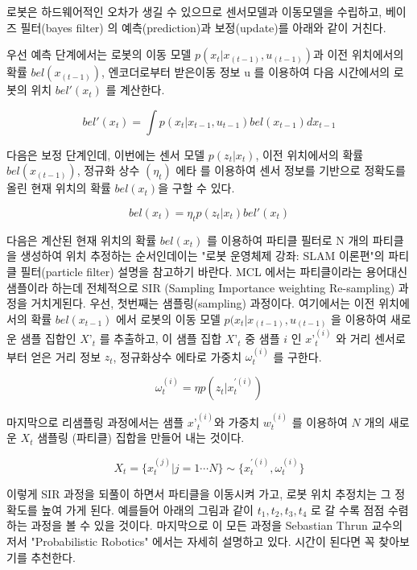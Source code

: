 로봇은 하드웨어적인 오차가 생길 수 있으므로 센서모델과 이동모델을 수립하고, 베이즈 필터(bayes filter) 의  예측(prediction)과 보정(update)를 아래와 같이 거친다. 

우선 예측 단계에서는 로봇의 이동 모델 $p( x_t | x_{(t-1)}, u_{(t-1)} )$과 이전 위치에서의 확률 $bel(x_{(t-1)})$, 엔코더로부터 받은이동 정보 u 를 이용하여 다음 시간에서의 로봇의 위치 $bel'(x_t)$ 를 계산한다.

\begin{equation}
  bel'(x_t) = \int p(x_t | x_{t-1},u_{t-1})bel(x_{t-1})dx_{t-1}
\end{equation}

다음은 보정 단계인데, 이번에는 센서 모델 $p( z_t | x_t )$, 이전 위치에서의 확률 $bel(x_{(t-1)})$, 정규화 상수 $(\eta_t)$ 에타 를 이용하여 센서 정보를 기반으로 정확도를 올린 현재 위치의 확률  $bel(x_t)$을 구할 수 있다.

\begin{equation}
  bel(x_t) = \eta_t p(z_t|x_t)bel'(x_t)
\end{equation}

다음은 계산된 현재 위치의 확률 $bel(x_t)$ 를 이용하여 파티클 필터로 N 개의 파티클을 생성하여 위치 추정하는 순서인데이는 "로봇 운영체제 강좌: SLAM 이론편"의 파티클 필터(particle filter) 설명을 참고하기 바란다. MCL 에서는 파티클이라는 용어대신 샘플이라 하는데 전체적으로 SIR (Sampling Importance weighting Re-sampling) 과정을 거치게된다. 우선, 첫번째는 샘플링(sampling) 과정이다. 여기에서는 이전 위치에서의 확률 $bel(x_{t-1})$ 에서 로봇의 이동 모델 $p( x_t | x_{(t-1)}, u_{(t-1)}$ 을 이용하여 새로운 샘플 집합인 ${X’}_t$  를 추출하고, 이 샘플 집합 $X{’}_t$ 중 샘플 $i$ 인 ${x’}_t^{(i)}$ 와 거리 센서로 부터 얻은 거리 정보 $z_t$, 정규화상수 에타로 가중치 $\omega_t^{(i)}$ 를 구한다. 

\begin{equation}
  \omega_t^{(i)} = \eta p(z_t|x_t^{\prime(i)})
\end{equation}

마지막으로 리샘플링 과정에서는 샘플 ${x’}_t^{(i)}$와 가중치 $w_t^{(i)}$ 를 이용하여 $N$ 개의 새로운 $X_t$ 샘플링 (파티클) 집합을 만들어 내는 것이다. 

\begin{equation}
  X_t = \{x_t^{(j)} | j=1 \cdots N\} \sim \{x_t^{\prime(i)},\omega_t^{(i)}\}
\end{equation}

이렇게 SIR 과정을 되풀이 하면서 파티클을 이동시켜 가고, 로봇 위치 추정치는 그 정확도를 높여 가게 된다. 예를들어 아래의 그림과 같이 $t_1, t_2, t_3, t_4$ 로 갈 수록 점점 수렴하는 과정을 볼 수 있을 것이다. 마지막으로 이 모든 과정을 Sebastian Thrun 교수의 저서 "Probabilistic Robotics"  에서는 자세히 설명하고 있다. 시간이 된다면 꼭 찾아보기를 추천한다. 

